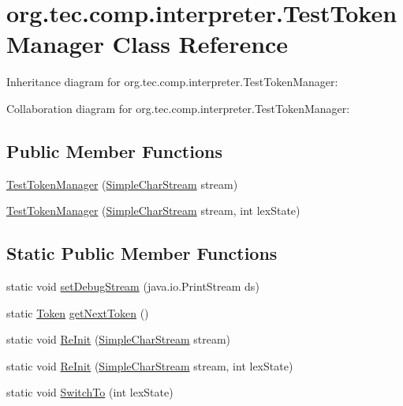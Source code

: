 \hypertarget{classorg_1_1tec_1_1comp_1_1interpreter_1_1_test_token_manager}{}\section{org.\+tec.\+comp.\+interpreter.\+Test\+Token\+Manager Class Reference}
\label{classorg_1_1tec_1_1comp_1_1interpreter_1_1_test_token_manager}


Inheritance diagram for org.\+tec.\+comp.\+interpreter.\+Test\+Token\+Manager\+:


Collaboration diagram for org.\+tec.\+comp.\+interpreter.\+Test\+Token\+Manager\+:
\subsection*{Public Member Functions}
\begin{DoxyCompactItemize}
\item 
\mbox{\hyperlink{classorg_1_1tec_1_1comp_1_1interpreter_1_1_test_token_manager_a51c1ef59664037b99be1294840f7a1dd}{Test\+Token\+Manager}} (\mbox{\hyperlink{classorg_1_1tec_1_1comp_1_1interpreter_1_1_simple_char_stream}{Simple\+Char\+Stream}} stream)
\item 
\mbox{\hyperlink{classorg_1_1tec_1_1comp_1_1interpreter_1_1_test_token_manager_a7627af24bc02cbeae8715dbb0d5c460f}{Test\+Token\+Manager}} (\mbox{\hyperlink{classorg_1_1tec_1_1comp_1_1interpreter_1_1_simple_char_stream}{Simple\+Char\+Stream}} stream, int lex\+State)
\end{DoxyCompactItemize}
\subsection*{Static Public Member Functions}
\begin{DoxyCompactItemize}
\item 
static void \mbox{\hyperlink{classorg_1_1tec_1_1comp_1_1interpreter_1_1_test_token_manager_a4d787a9ce35834cfd5b60b03a03a627d}{set\+Debug\+Stream}} (java.\+io.\+Print\+Stream ds)
\item 
static \mbox{\hyperlink{classorg_1_1tec_1_1comp_1_1interpreter_1_1_token}{Token}} \mbox{\hyperlink{classorg_1_1tec_1_1comp_1_1interpreter_1_1_test_token_manager_ac7a6bdcbdc59bf06afd198078ba856b7}{get\+Next\+Token}} ()
\item 
static void \mbox{\hyperlink{classorg_1_1tec_1_1comp_1_1interpreter_1_1_test_token_manager_a12997c4905cdbc27e290b62d36678a28}{Re\+Init}} (\mbox{\hyperlink{classorg_1_1tec_1_1comp_1_1interpreter_1_1_simple_char_stream}{Simple\+Char\+Stream}} stream)
\item 
static void \mbox{\hyperlink{classorg_1_1tec_1_1comp_1_1interpreter_1_1_test_token_manager_a95dbd8dfafd5300bce1d337969b6e2d7}{Re\+Init}} (\mbox{\hyperlink{classorg_1_1tec_1_1comp_1_1interpreter_1_1_simple_char_stream}{Simple\+Char\+Stream}} stream, int lex\+State)
\item 
static void \mbox{\hyperlink{classorg_1_1tec_1_1comp_1_1interpreter_1_1_test_token_manager_a819ed8a2fbfac92631b35689bb82d24a}{Switch\+To}} (int lex\+State)
\end{DoxyCompactItemize}
